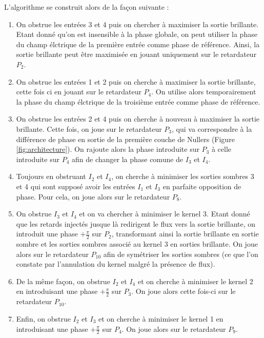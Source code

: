 \documentclass{aa}
\begin{document}
            L'algorithme se construit alors de la façon suivante :

            \begin{enumerate}
                \item On obstrue les entrées 3 et 4 puis on chercher à maximiser la sortie brillante. Etant donné qu'on est insensible à la phase globale, on peut utiliser la phase du champ élctrique de la première entrée comme phase de référence. Ainsi, la sortie brillante peut être maximisée en jouant uniquement sur le retardateur $P_2$.
                \item On obstrue les entrées 1 et 2 puis on cherche à maximiser la sortie brillante, cette fois ci en jouant sur le retardateur $P_4$. On utilise alors temporairement la phase du champ élctrique de la troisième entrée comme phase de référence.
                \item On obstrue les entrées 2 et 4 puis on cherche à nouveau à maximiser la sortie brillante. Cette fois, on joue sur le retardateur $P_3$, qui va correspondre à la différence de phase en sortie de la première couche de Nullers (Figure \ref{fig:architecture}). On rajoute alors la phase introduite sur $P_3$ à celle introduite sur $P_4$ afin de changer la phase comune de $I_3$ et $I_4$.
                \item Toujours en obstruant $I_2$ et $I_4$, on cherche à minimiser les sorties sombres 3 et 4 qui sont supposé avoir les entrées $I_1$ et $I_3$ en parfaite opposition de phase. Pour cela, on joue alors sur le retardateur $P_8$.
                \item On obstrue $I_3$ et $I_4$ et on va chercher à minimiser le kernel 3. Etant donné que les retards injectés jusque là redirigent le flux vers la sortie brillante, on introduit une phase $+\frac{\pi}{2}$ sur $P_2$, transformant ainsi la sortie brillante en sortie sombre et les sorties sombres associé au kernel 3 en sorties brillante. On joue alors sur le retardateur $P_10$ afin de symétriser les sorties sombres (ce que l'on constate par l'annulation du kernel malgré la présence de flux).
                \item De la même façon, on obstrue $I_2$ et $I_4$ et on cherche à minimiser le kernel 2 en introduisant une phase $+\frac{\pi}{2}$ sur $P_3$. On joue alors cette fois-ci sur le retardateur $P_10$.
                \item Enfin, on obstrue $I_2$ et $I_3$ et on cherche à minimiser le kernel 1 en introduisant une phase $+\frac{\pi}{2}$ sur $P_4$. On joue alors sur le retardateur $P_9$.
            \end{enumerate}
\end{document}
